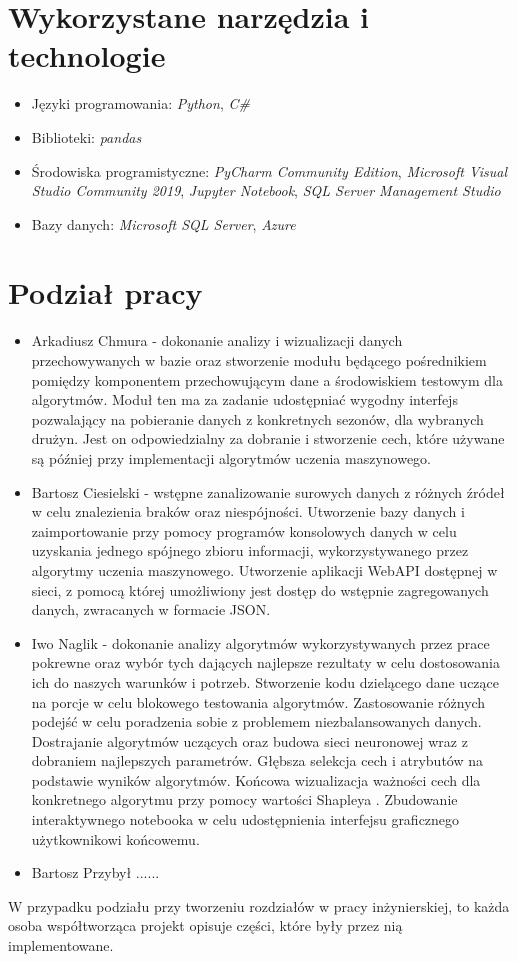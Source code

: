 \section{Wykorzystane narzędzia i technologie}
\begin{itemize}
    \item Języki programowania: \textit{Python}, \textit{C\#}
    \item Biblioteki: \textit{pandas}
    \item Środowiska programistyczne: \textit{PyCharm Community Edition}, \textit{Microsoft Visual Studio Community 2019}, \textit{Jupyter Notebook}, \textit{SQL Server Management Studio}
    \item Bazy danych: \textit{Microsoft SQL Server}, \textit{Azure}
\end{itemize}
\section{Podział pracy}
\begin{itemize}
    \item Arkadiusz Chmura - dokonanie analizy i wizualizacji danych przechowywanych w bazie oraz stworzenie modułu będącego pośrednikiem pomiędzy komponentem przechowującym dane a środowiskiem testowym dla algorytmów. Moduł ten ma za zadanie udostępniać wygodny interfejs pozwalający na pobieranie danych z konkretnych sezonów, dla wybranych drużyn. Jest on odpowiedzialny za dobranie i stworzenie cech, które używane są później przy implementacji algorytmów uczenia maszynowego.
    \item Bartosz Ciesielski - wstępne zanalizowanie surowych danych z różnych źródeł w celu znalezienia braków oraz niespójności. Utworzenie bazy danych i zaimportowanie przy pomocy programów konsolowych danych w celu uzyskania jednego spójnego zbioru informacji, wykorzystywanego przez algorytmy uczenia maszynowego. Utworzenie aplikacji WebAPI  dostępnej w sieci, z pomocą której umożliwiony jest dostęp do wstępnie zagregowanych danych, zwracanych w formacie JSON.
    \item Iwo Naglik - dokonanie analizy algorytmów wykorzystywanych przez prace pokrewne oraz wybór tych dających najlepsze rezultaty w celu dostosowania ich do naszych warunków i potrzeb. Stworzenie kodu dzielącego dane uczące na porcje w celu blokowego testowania algorytmów. Zastosowanie różnych podejść w celu poradzenia sobie z problemem niezbalansowanych danych. Dostrajanie algorytmów uczących oraz budowa sieci neuronowej wraz z dobraniem najlepszych parametrów. Głębsza selekcja cech i atrybutów na podstawie wyników algorytmów. Końcowa wizualizacja ważności cech dla konkretnego algorytmu przy pomocy wartości Shapleya \cite{shapley}. Zbudowanie interaktywnego notebooka w celu udostępnienia interfejsu graficznego użytkownikowi końcowemu.
    \item Bartosz Przybył ......
\end{itemize}
W przypadku podziału przy tworzeniu rozdziałów w pracy inżynierskiej, to każda osoba współtworząca projekt opisuje części, które były przez nią implementowane.